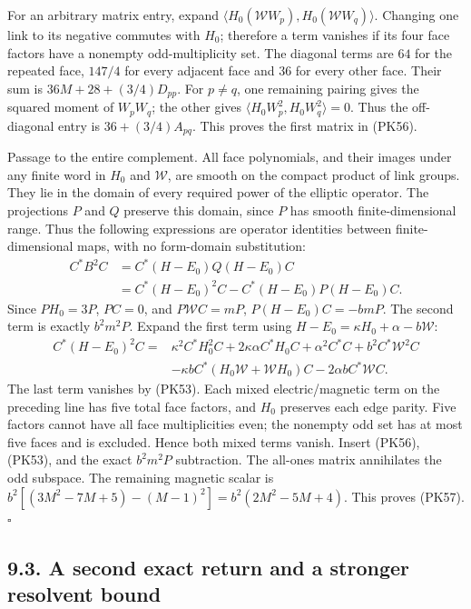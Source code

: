 \documentclass[11pt]{article}
\begin{document}
For an arbitrary matrix entry, expand
\(\langle H_0(\mathcal WW_p),H_0(\mathcal WW_q)\rangle\).
Changing one link to its negative commutes with \(H_0\); therefore a term
vanishes if its four face factors have a nonempty odd-multiplicity set.
The diagonal terms are \(64\) for the repeated face, \(147/4\) for every
adjacent face and \(36\) for every other face. Their sum is
\(36M+28+(3/4)D_{pp}\).
For \(p\ne q\), one remaining pairing gives the squared moment of
\(W_pW_q\); the other gives
\(\langle H_0W_p^2,H_0W_q^2\rangle=0\).
Thus the off-diagonal entry is \(36+(3/4)A_{pq}\).
This proves the first matrix in (PK56).

Passage to the entire complement.
All face polynomials, and their images under any finite word in \(H_0\)
and \(\mathcal W\), are smooth on the compact product of link groups.
They lie in the domain of every required power of the elliptic operator.
The projections \(P\) and \(Q\) preserve this domain, since \(P\) has smooth
finite-dimensional range. Thus the following expressions are operator
identities between finite-dimensional maps, with no form-domain
substitution:
\[
\begin{aligned}
 C^*B^2C
 &=C^*(H-E_0)Q(H-E_0)C\\
 &=C^*(H-E_0)^2C-C^*(H-E_0)P(H-E_0)C.
\end{aligned}
\]
Since \(PH_0=3P\), \(PC=0\), and \(P\mathcal WC=mP\),
\(P(H-E_0)C=-bmP\). The second term is exactly \(b^2m^2P\).
Expand the first term using \(H-E_0=\kappa H_0+\alpha-b\mathcal W\):
\[
\begin{aligned}
 C^*(H-E_0)^2C={}&
 \kappa^2C^*H_0^2C+2\kappa\alpha C^*H_0C+\alpha^2 C^*C
 +b^2C^*\mathcal W^2C\\
 &-\kappa b C^*(H_0\mathcal W+\mathcal WH_0)C
 -2\alpha b C^*\mathcal WC.
\end{aligned}
\]
The last term vanishes by (PK53). Each mixed electric/magnetic term on
the preceding line has five total face factors, and \(H_0\) preserves
each edge parity. Five factors cannot have all face multiplicities even;
the nonempty odd set has at most five faces and is excluded. Hence both
mixed terms vanish. Insert (PK56), (PK53), and the exact \(b^2m^2P\)
subtraction. The all-ones matrix annihilates the odd subspace. The remaining
magnetic scalar is
\(b^2[(3M^2-7M+5)-(M-1)^2]=b^2(2M^2-5M+4)\).
This proves (PK57). \(\square\)

\subsection*{9.3. A second exact return and a stronger resolvent bound}
\end{document}
